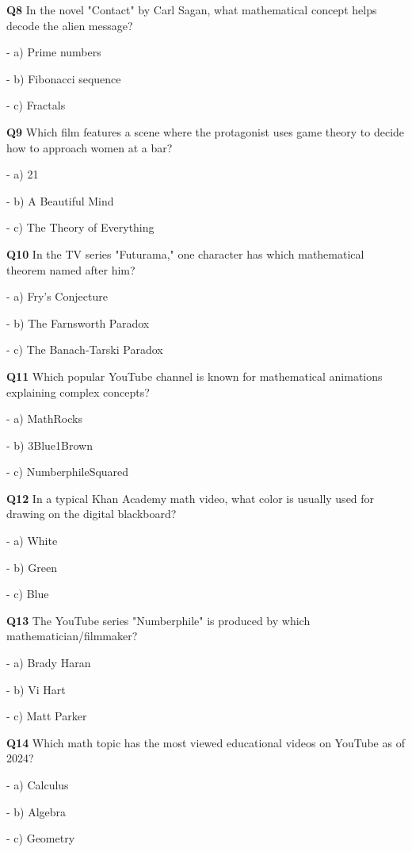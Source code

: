 \textbf{Q8} In the novel "Contact" by Carl Sagan, what mathematical concept helps decode the alien message?\par
\quad - a) Prime numbers\par
\quad - b) Fibonacci sequence\par
\quad - c) Fractals\par

\textbf{Q9} Which film features a scene where the protagonist uses game theory to decide how to approach women at a bar?\par
\quad - a) 21\par
\quad - b) A Beautiful Mind\par
\quad - c) The Theory of Everything\par

\textbf{Q10} In the TV series "Futurama," one character has which mathematical theorem named after him?\par
\quad - a) Fry's Conjecture\par
\quad - b) The Farnsworth Paradox\par
\quad - c) The Banach‑Tarski Paradox\par

\textbf{Q11} Which popular YouTube channel is known for mathematical animations explaining complex concepts?\par
\quad - a) MathRocks\par
\quad - b) 3Blue1Brown\par
\quad - c) NumberphileSquared\par

\textbf{Q12} In a typical Khan Academy math video, what color is usually used for drawing on the digital blackboard?\par
\quad - a) White\par
\quad - b) Green\par
\quad - c) Blue\par

\textbf{Q13} The YouTube series "Numberphile" is produced by which mathematician/filmmaker?\par
\quad - a) Brady Haran\par
\quad - b) Vi Hart\par
\quad - c) Matt Parker\par

\textbf{Q14} Which math topic has the most viewed educational videos on YouTube as of 2024?\par
\quad - a) Calculus\par
\quad - b) Algebra\par
\quad - c) Geometry\par

